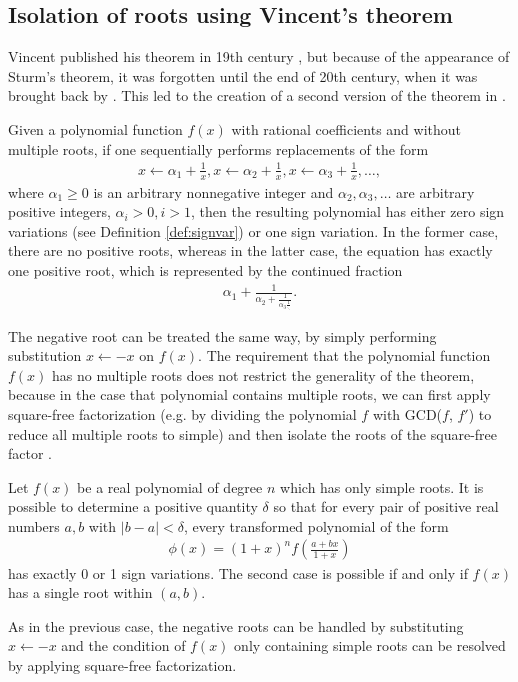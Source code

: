 \documentclass[
  digital, %
  notable,   %
  nolof,     %
  nolot,     %
	final, %
]{fithesis3}
\begin{document}
\subsection{Isolation of roots using Vincent's theorem}
Vincent published his theorem in 19th century \parencite{vincentT1, vincentT2}, but because of the appearance of Sturm's theorem, it was forgotten until the end of 20th century, when it was brought back by \parencite{akritasphd}. This led to the creation of a second version of the theorem in \parencite{vincentBis}.
\begin{theorem}
\label{theor:v1}
Given a polynomial function $f(x)$ with rational coefficients and without multiple roots, if one sequentially performs replacements of the form
\begin{align}
x\leftarrow \alpha_{1} + \frac{1}{x}, x\leftarrow \alpha_{2} + \frac{1}{x}, x\leftarrow \alpha_{3} + \frac{1}{x},\ldots,
\end{align}
where $\alpha_{1}\geq 0$ is an arbitrary nonnegative integer and $\alpha_{2}, \alpha_{3},\ldots$ are arbitrary positive integers, $\alpha_{i} > 0, i > 1$, then the resulting polynomial has either zero sign variations (see Definition \ref{def:signvar}) or one sign variation. In the former case, there are no positive roots, whereas in the latter case, the equation has exactly one positive root, which is represented by the continued fraction
\begin{align}
\alpha_{1}+\frac{1}{\alpha_{2}+\frac{1}{\alpha_{3}\frac{1}{\ddots}}}.
\end{align}
\end{theorem}
The negative root can be treated the same way, by simply performing substitution $x \leftarrow -x$ on $f(x)$.
The requirement that the polynomial function $f(x)$ has no multiple roots does not restrict the generality of the theorem, because in the case that polynomial contains multiple roots, we can first apply square-free factorization (e.g. by dividing the polynomial $f$ with GCD($f$, $f'$) to reduce all multiple roots to simple) and then isolate the roots of the square-free factor \parencite{vincentA}.

\begin{theorem}
\label{theor:v2}
Let $f(x)$ be a real polynomial of degree $n$ which has only simple roots. It is possible to determine a positive quantity $\delta$ so that for every pair of positive real numbers $a, b$ with $\left|b - a\right| < \delta$, every transformed polynomial of the form
\begin{align}
\phi(x) = (1 + x)^{n} f\left(\frac{a + bx}{1 + x}\right)
\end{align}
has exactly 0 or 1 sign variations. The second case is possible if and only if $f(x)$ has a single root within $(a,b)$.
\end{theorem}
As in the previous case, the negative roots can be handled by substituting $x \leftarrow -x$ and the condition of $f(x)$ only containing simple roots can be resolved by applying square-free factorization.
\end{document}
